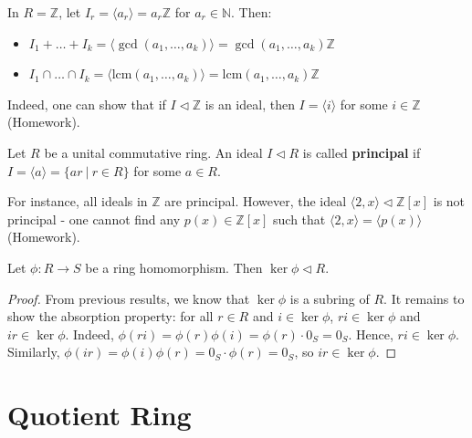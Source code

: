 \begin{example}
In $R = \mathbb{Z}$, let $I_r = \langle a_r \rangle = a_r \mathbb{Z}$ for $a_r \in \mathbb{N}$. Then:
\begin{itemize}
    \item $I_1 + \dots + I_k = \langle \gcd(a_1, \dots, a_k) \rangle = \gcd(a_1, \dots, a_k) \mathbb{Z}$
    \item $I_1 \cap \dots \cap I_k = \langle \text{lcm}(a_1, \dots, a_k) \rangle =\text{lcm}(a_1, \dots, a_k) \mathbb{Z}$
\end{itemize}
Indeed, one can show that if $I \lhd \mathbb{Z}$ is an ideal, then $I = \langle i \rangle$ for some $i \in \mathbb{Z}$ (Homework).
\end{example}

\begin{definition}
Let $R$ be a unital commutative ring. An ideal $I \triangleleft R$ is called \textbf{principal} if $I = \langle a \rangle = \{ar\ |\ r \in R\}$ for some $a \in R$.
\end{definition}
For instance, all ideals in $\mathbb{Z}$ are principal. However, the ideal $\langle 2, x \rangle \lhd \mathbb{Z}[x]$ is not principal - one cannot find any $p(x) \in \mathbb{Z}[x]$ such that $\langle 2,x \rangle = \langle p(x) \rangle$ (Homework).


\begin{proposition}
Let $\phi: R \to S$ be a ring homomorphism. Then $\ker \phi \triangleleft R$.
\end{proposition}

\begin{proof}
From previous results, we know that $\ker \phi$ is a subring of $R$. It remains to show the absorption property: for all $r \in R$ and $i \in \ker \phi$, $ri \in \ker \phi$ and $ir \in \ker \phi$.
Indeed, $\phi(ri) = \phi(r)\phi(i) = \phi(r) \cdot 0_S = 0_S$. Hence, $ri \in \ker \phi$. Similarly, $\phi(ir) = \phi(i)\phi(r) = 0_S \cdot \phi(r) = 0_S$, so $ir \in \ker \phi$. \qedhere
\end{proof}

\section{Quotient Ring}

